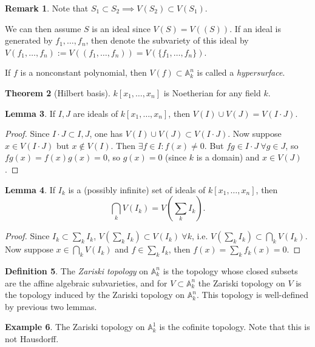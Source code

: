 \documentclass{article}
\newcommand{\A}{\mathbb{A}}
\theoremstyle{definition}
\newtheorem{defn}{Definition}[subsection]
\newtheorem{thm}[defn]{Theorem}
\newtheorem{lemma}[defn]{Lemma}
\newtheorem{example}[defn]{Example}
\newtheorem{remark}[defn]{Remark}
\begin{document}
\begin{remark}
Note that $S_1\subset S_2\implies V(S_2)\subset V(S_1)$.

We can then assume $S$ is an ideal since $V(S)=V((S))$. If an ideal is generated by $f_1,\ldots,f_n$, then denote the subvariety of this ideal by $V(f_1,\ldots,f_n):=V((f_1,\ldots,f_n))=V(\{f_1,\ldots,f_n\})$.

If $f$ is a nonconstant polynomial, then $V(f)\subset\A_k^n$ is called a \textit{hypersurface}.
\end{remark}

\begin{thm}[Hilbert basis]
$k[x_1,\ldots,x_n]$ is Noetherian for any field $k$.
\end{thm}

\begin{lemma}
If $I,J$ are ideals of $k[x_1,\ldots,x_n]$, then $V(I)\cup V(J)=V(I\cdot J)$.
\end{lemma}
\begin{proof}
Since $I\cdot J\subset I,J$, one has $V(I)\cup V(J)\subset V(I\cdot J)$. Now suppose $x\in V(I\cdot J)$ but $x\notin V(I)$. Then $\exists f\in I:f(x)\neq 0$. But $fg\in I\cdot J\ \forall g\in J$, so $fg(x)=f(x)g(x)=0$, so $g(x)=0$ (since $k$ is a domain) and $x\in V(J)$.
\end{proof}

\begin{lemma}
If $I_k$ is a (possibly infinite) set of ideals of $k[x_1,\ldots,x_n]$, then
\[
\bigcap_k V(I_k)=V\left(\sum_k I_k\right).
\]
\end{lemma}
\begin{proof}
Since $I_k\subset\sum_k I_k$, $V\left(\sum_k I_k\right)\subset V(I_k)\ \forall k$, i.e. $V\left(\sum_k I_k\right)\subset\bigcap_k V(I_k)$. Now suppose $x\in \bigcap_k V(I_k)$ and $f\in\sum_k I_k$, then $f(x)=\sum_k f_k(x)=0$.
\end{proof}

\begin{defn}
The \textit{Zariski topology} on $\A_k^n$ is the topology whose closed subsets are the affine algebraic subvarieties, and for $V\subset\A_k^n$ the Zariski topology on $V$ is the topology induced by the Zariski topology on $\A_k^n$. This topology is well-defined by previous two lemmas.
\end{defn}

\begin{example}
The Zariski topology on $\A_k^1$ is the cofinite topology. Note that this is not Hausdorff.
\end{example}
\end{document}
